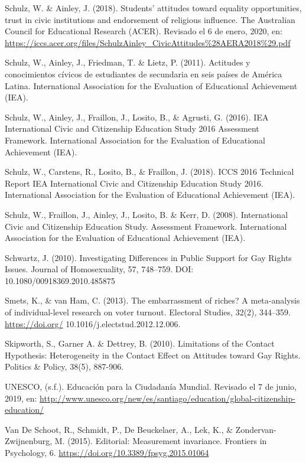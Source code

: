 \documentclass[12pt,twoside]{templates/facsothesis}
\begin{document}
Schulz, W. \& Ainley, J. (2018). Students' attitudes toward equality opportunities, trust in civic institutions and endorsement of religious influence. The Australian Council for Educational Research (ACER). Revisado el 6 de enero, 2020, en: \url{https://iccs.acer.org/files/SchulzAinley_CivicAttitudes\%28AERA2018\%29.pdf}

Schulz, W., Ainley, J., Friedman, T. \& Lietz, P. (2011). Actitudes y conocimientos cívicos de estudiantes de secundaria en seis países de América Latina. International Association for the Evaluation of Educational Achievement (IEA).

Schulz, W., Ainley, J., Fraillon, J., Losito, B., \& Agrusti, G. (2016). IEA International Civic and Citizenship Education Study 2016 Assessment Framework. International Association for the Evaluation of Educational Achievement (IEA).

Schulz, W., Carstens, R., Losito, B., \& Fraillon, J. (2018). ICCS 2016 Technical Report IEA International Civic and Citizenship Education Study 2016. International Association for the Evaluation of Educational Achievement (IEA).

Schulz, W., Fraillon, J., Ainley, J., Losito, B. \& Kerr, D. (2008). International Civic and Citizenship Education Study. Assessment Framework. International Association for the Evaluation of Educational Achievement (IEA).

Schwartz, J. (2010). Investigating Differences in Public Support for Gay Rights Issues. Journal of Homosexuality, 57, 748--759. DOI: 10.1080/00918369.2010.485875

Smets, K., \& van Ham, C. (2013). The embarrassment of riches? A meta-analysis of individual-level research on voter turnout. Electoral Studies, 32(2), 344--359. \url{https://doi.org/} 10.1016/j.electstud.2012.12.006.

Skipworth, S., Garner A. \& Dettrey, B. (2010). Limitations of the Contact Hypothesis: Heterogeneity in the Contact Effect on Attitudes toward Gay Rights. Politics \& Policy, 38(5), 887-906.

UNESCO, (s.f.). Educación para la Ciudadanía Mundial. Revisado el 7 de junio, 2019, en: \url{http://www.unesco.org/new/es/santiago/education/global-citizenship-education/}

Van De Schoot, R., Schmidt, P., De Beuckelaer, A., Lek, K., \& Zondervan-Zwijnenburg, M. (2015). Editorial: Measurement invariance. Frontiers in Psychology, 6. \url{https://doi.org/10.3389/fpsyg.2015.01064}
\end{document}
